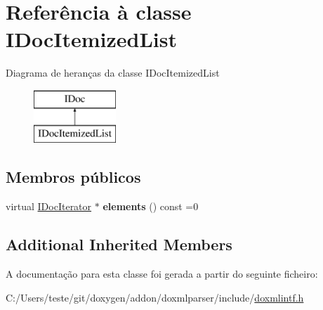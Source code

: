 \hypertarget{class_i_doc_itemized_list}{\section{Referência à classe I\-Doc\-Itemized\-List}
\label{class_i_doc_itemized_list}
}
Diagrama de heranças da classe I\-Doc\-Itemized\-List\begin{figure}[H]
\begin{center}
\leavevmode
\includegraphics[height=2.000000cm]{class_i_doc_itemized_list}
\end{center}
\end{figure}
\subsection*{Membros públicos}
\begin{DoxyCompactItemize}
\item 
\hypertarget{class_i_doc_itemized_list_ad6ead2baea7fba8812ab68d4125fc932}{virtual \hyperlink{class_i_doc_iterator}{I\-Doc\-Iterator} $\ast$ {\bfseries elements} () const =0}\label{class_i_doc_itemized_list_ad6ead2baea7fba8812ab68d4125fc932}

\end{DoxyCompactItemize}
\subsection*{Additional Inherited Members}


A documentação para esta classe foi gerada a partir do seguinte ficheiro\-:\begin{DoxyCompactItemize}
\item 
C\-:/\-Users/teste/git/doxygen/addon/doxmlparser/include/\hyperlink{include_2doxmlintf_8h}{doxmlintf.\-h}\end{DoxyCompactItemize}
